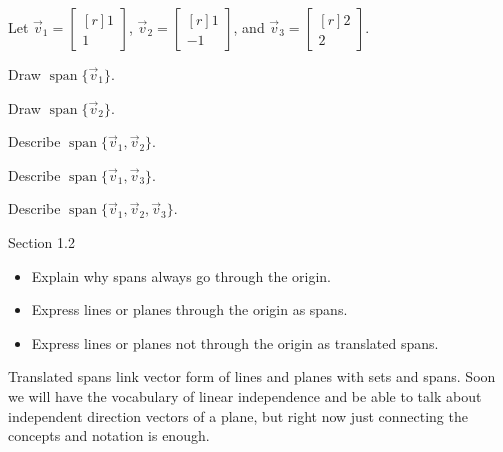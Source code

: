 \documentclass{problemset}
\DeclareMathOperator{\Span}{span}
\newcommand{\mat}[1]{\begin{bmatrix*}[r]#1\end{bmatrix*}}
\begin{document}
	\question
	Let $\vec v_1=\mat{1\\1}$, $\vec v_2=\mat{1\\-1}$, and $\vec v_3=\mat{2\\2}$.
	\begin{parts}
		\item Draw $\Span\{\vec v_1\}$.
		\item Draw $\Span\{\vec v_2\}$.
		\item Describe $\Span\{\vec v_1,\vec v_2\}$.
		\item Describe $\Span\{\vec v_1,\vec v_3\}$.
		\item Describe $\Span\{\vec v_1,\vec v_2,\vec v_3\}$.
	\end{parts}


\begin{lesson}
	\newpage

	Section 1.2

	\begin{itemize}
		\item Explain why spans always go through the origin.
		\item Express lines or planes through the origin as spans.
		\item Express lines or planes not through the origin as translated spans.
	\end{itemize}

	Translated spans link vector form of lines and planes with sets and spans.
	Soon we will have the vocabulary of linear independence and be able to
	talk about independent direction vectors of a plane, but right now just connecting
	the concepts and notation is enough.

	\newpage
\end{lesson}
\end{document}

